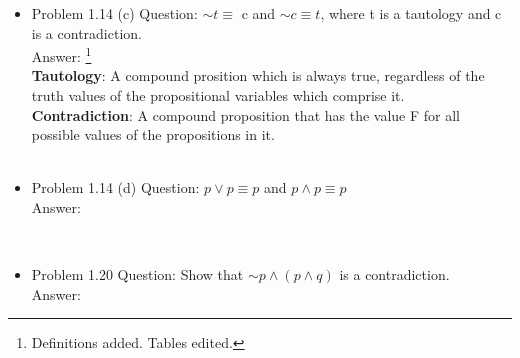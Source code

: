 \documentclass[11pt]{article}
\begin{document}
\begin{itemize}
\item
Problem 1.14 (c)
Question:  $\sim t \equiv$ c and $\sim c \equiv t$, where t is a tautology and c is a contradiction. \\
Answer: \footnote{Definitions added. Tables edited.}\\
\textbf{Tautology}: A compound prosition which is always true, regardless of the truth values of the propositional variables which comprise it.\\
\textbf{Contradiction}: A compound proposition that has the value F for all possible values of the propositions in it. \\

\\
\noindent{ \color{red} \rule{\linewidth} {0.5mm} }
\clearpage

\item
Problem 1.14 (d) 
Question: $p \lor p \equiv p$ and $p \land p \equiv p$ \\
Answer:
  
 \\
\noindent{ \color{red} \rule{\linewidth} {0.5mm} }

\item
Problem 1.20 
Question: Show that $\sim p \land (p \land q)$ is a contradiction. \\
Answer: 
 
\clearpage
\end{itemize}
\end{document}
